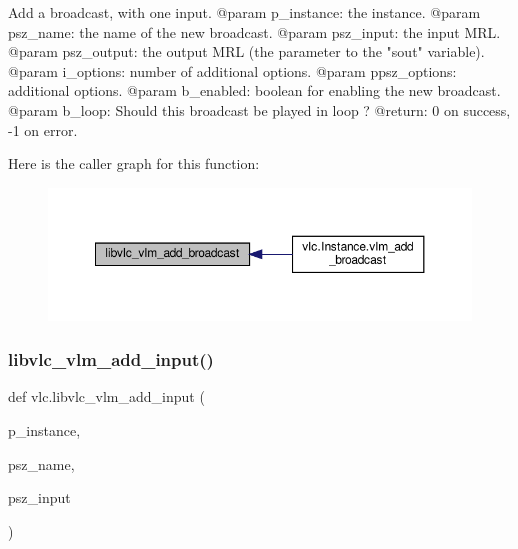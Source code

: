 \begin{DoxyVerb}Add a broadcast, with one input.
@param p_instance: the instance.
@param psz_name: the name of the new broadcast.
@param psz_input: the input MRL.
@param psz_output: the output MRL (the parameter to the "sout" variable).
@param i_options: number of additional options.
@param ppsz_options: additional options.
@param b_enabled: boolean for enabling the new broadcast.
@param b_loop: Should this broadcast be played in loop ?
@return: 0 on success, -1 on error.
\end{DoxyVerb}
 Here is the caller graph for this function\+:
\nopagebreak
\begin{figure}[H]
\begin{center}
\leavevmode
\includegraphics[width=350pt]{namespacevlc_a7560226e5cabbe0664a8e51c772e07cf_icgraph}
\end{center}
\end{figure}
\mbox{\label{namespacevlc_a59da7a569de70dd7f4b85f35706b0aa1}} 
\subsubsection{\texorpdfstring{libvlc\+\_\+vlm\+\_\+add\+\_\+input()}{libvlc\_vlm\_add\_input()}}
{\footnotesize\ttfamily def vlc.\+libvlc\+\_\+vlm\+\_\+add\+\_\+input (\begin{DoxyParamCaption}\item[{}]{p\+\_\+instance,  }\item[{}]{psz\+\_\+name,  }\item[{}]{psz\+\_\+input }\end{DoxyParamCaption})}

